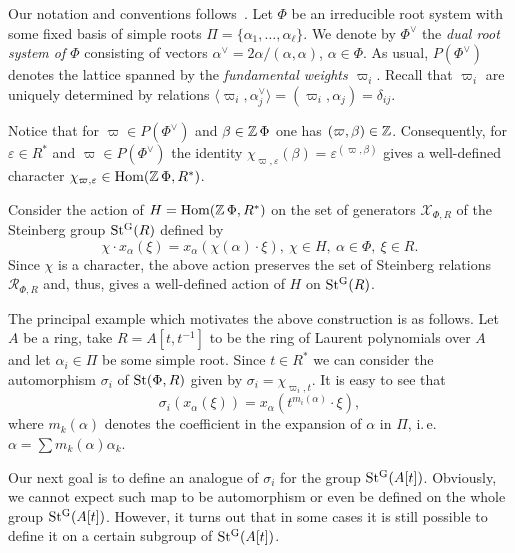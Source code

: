 Our notation and conventions follows~\cite[\S~4]{VavWE}.
Let $\Phi$ be an irreducible root system with some fixed basis of simple roots $\Pi = \{\alpha_1, \ldots, \alpha_\ell\}$.
We denote by $\Phi^\vee$ the \emph{dual root system of $\Phi$} consisting of vectors $\alpha^\vee = 2\alpha/(\alpha, \alpha)$, $\alpha\in \Phi$.
As usual, $P(\Phi^\vee)$ denotes the lattice spanned by the \emph{fundamental weights $\varpi_i$}.
Recall that $\varpi_i$ are uniquely determined by relations $\langle\varpi_i, \alpha_j^\vee \rangle = (\varpi_i, \alpha_j) = \delta_{ij}.$

Notice that for $\varpi \in P(\Phi^\vee)$ and $\beta \in \operatorname{{\mathbb Z}} \Phi$ one has $(\varpi, \beta) \in \operatorname{{\mathbb Z}}$.
Consequently, for $\varepsilon \in R^*$ and $\varpi \in P(\Phi^\vee)$ the identity $\chi_{\varpi, \varepsilon}(\beta) = \varepsilon ^ {(\varpi, \beta)}$
gives a well-defined character $\chi_{\varpi, \varepsilon} \in \operatorname{Hom}(\operatorname{{\mathbb Z}} \Phi, R^*)$.

Consider the action of $H=\operatorname{Hom}(\operatorname{{\mathbb Z}} \Phi, R^*)$ on the set of generators $\mathcal{X}_{\Phi, R}$ of the Steinberg group $\operatorname{St^G}(R)$ defined by
\begin{equation} \chi \cdot x_\alpha(\xi) = x_\alpha(\chi(\alpha) \cdot \xi),\ \chi \in H,\ \alpha\in \Phi,\ \xi \in R. \end{equation}
Since $\chi$ is a character, the above action preserves the set of Steinberg relations $\mathcal{R}_{\Phi, R}$ and,
thus, gives a well-defined action of $H$ on $\operatorname{St^G}(R)$.

\begin{example} The principal example which motivates the above construction is as follows.
Let $A$ be a ring, take $R = A[t, t^{-1}]$ to be the ring of Laurent polynomials over $A$ and let $\alpha_i \in \Pi$ be some simple root.
Since $t \in R^*$ we can consider the automorphism $\sigma_i$ of $\mathrm{St}(\Phi, R)$ given by $\sigma_i = \chi_{\varpi_i, t}$.
It is easy to see that 
\begin{equation}\sigma_i(x_\alpha(\xi)) = x_\alpha(t^{m_i(\alpha)} \cdot \xi),\end{equation}
where $m_k(\alpha)$ denotes the coefficient in the expansion of $\alpha$ in $\Pi$, i.\,e. $\alpha = \sum m_k(\alpha) \alpha_k$.
\end{example}

Our next goal is to define an analogue of $\sigma_i$ for the group $\operatorname{St^G}(A[t])$.
Obviously, we cannot expect such map to be automorphism or even be defined on the whole group $\operatorname{St^G}(A[t])$.
However, it turns out that in some cases it is still possible to define it on a certain subgroup of $\operatorname{St^G}(A[t])$.

